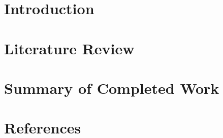 \documentclass[a4paper,11pt]{article}
\begin{document}
\section{Introduction}

\section{Literature Review}

\section{Summary of Completed Work}

\newpage
\section{References}

\newpage
\appendix

\end{document}
